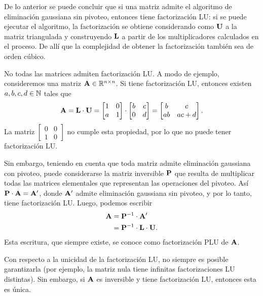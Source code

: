 De lo anterior se puede concluir que si una matriz admite el algoritmo de
eliminación gaussiana sin pivoteo, entonces tiene factorización LU:
si se puede ejecutar el algoritmo,
la factorización se obtiene considerando como $\mathbf{U}$ a la matriz
triangulada y construyendo $\mathbf{L}$ a partir de los multiplicadores
calculados en el proceso. De allí que la complejidad de obtener la
factorización también sea de orden cúbico.


No todas las matrices admiten factorización LU. A modo de ejemplo,
consideremos una matriz $\mathbf{A} \in \mathbb{R}^{n \times n}$. Si tiene
factorización LU, entonces existen $a, b, c, d \in \mathbb{N}$ tales que
\[ \mathbf{A} = \mathbf{L} \cdot \mathbf{U} = \begin{bmatrix}
        1 & 0 \\
        a & 1
    \end{bmatrix} \cdot \begin{bmatrix}
        b & c \\
        0 & d
    \end{bmatrix} = \begin{bmatrix}
        b  & c    \\
        ab & ac+d
    \end{bmatrix}. \]
La matriz $\begin{bmatrix} 0 & 0 \\ 1 & 0 \end{bmatrix}$ no cumple esta
propiedad, por lo que no puede tener factorización LU.

Sin embargo, teniendo en cuenta que toda matriz admite eliminación gaussiana
con pivoteo, puede considerarse la matriz inversible $\mathbf{P}$ que resulta de
multiplicar todas las matrices elementales que representan las operaciones
del pivoteo.
Así $\mathbf{P} \cdot \mathbf{A} = \mathbf{A'}$, donde $\mathbf{A'}$ admite eliminación
gaussiana sin pivoteo, y por lo tanto, tiene factorización LU.
Luego, podemos escribir
\[ \begin{aligned}
    \mathbf{A}
    &= \mathbf{P}^{-1} \cdot \mathbf{A'} \\
    &= \mathbf{P}^{-1} \cdot \mathbf{L} \cdot \mathbf{U}.
\end{aligned} \]
Esta escritura, que siempre existe, se conoce como factorización PLU
de $\mathbf{A}$.

Con respecto a la unicidad de la factorización LU, no siempre es posible
garantizarla (por ejemplo, la matriz nula tiene infinitas factorizaciones
LU distintas). Sin embargo, si $\mathbf{A}$ es inversible y tiene factorización
LU, entonces esta es única. %


